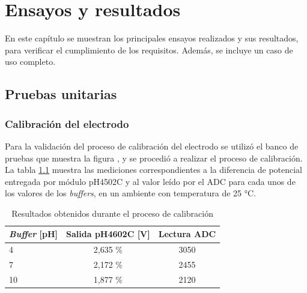 
\chapter{Ensayos y resultados} %

\label{Chapter4} %

En este capítulo se muestran los principales ensayos realizados y sus resultados, para verificar el cumplimiento de los requisitos. Además, se incluye un caso de uso completo.


\section{Pruebas unitarias}
\label{sec:pruebasUnitarias}

\subsection{Calibración del electrodo}

Para la validación del proceso de calibración del electrodo se utilizó el banco de pruebas que muestra la figura         , y se procedió a realizar el proceso de calibración. La tabla \ref{tab:ensayoCalibracion} muestra las mediciones correspondientes a la diferencia de potencial entregada por módulo pH4502C y al valor leído por el ADC para cada unos de los valores de los \textit{buffers}, en un ambiente con temperatura de 25 °C.

\begin{table}[h]
	\centering
	\caption[Resultados calibración]{Resultados obtenidos durante el proceso de calibración}
	\begin{tabular}{l c c }    
		\toprule
		\textbf{\textit{Buffer} [pH]} & \textbf{Salida pH4602C [V] }	&    \textbf{Lectura ADC}  \\
		\midrule
		4 	& 2,635 \% & 3050 \\		
		7	& 2,172 \% & 2455 \\
		10	& 1,877 \% & 2120 \\
		\bottomrule
		\hline
	\end{tabular}
	\label{tab:ensayoCalibracion}
\end{table}

